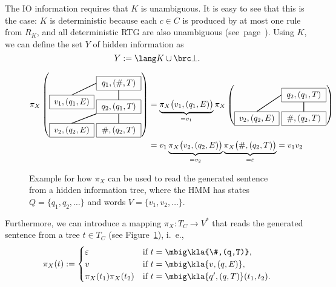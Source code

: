 The IO information requires that $K$ is unambiguous. It is easy to see that
this is the case: $K$ is deterministic because each $c\in C$ is produced by at
most one rule from $R_K$, and all deterministic RTG are also unambiguous
(see~page~\pageref{lemma:02-deterministic-is-unambiguous}).
Using $K$, we can define the set $Y$ of hidden information as
\[
 Y := \lang K \cup \brc\bot.
\]

\begin{figure}[t!]
 \begin{align*}
  \pi_X\left(\begin{tikzpicture}[every node/.style={rectangle,draw,minimum width=1.9cm},baseline=(current bounding box.center)]
   \node (t0) at (0,0) { $q_1,(\#,T)$ };
   \node (t1) at (0,-1) { $q_2,(q_1,T)$ } edge[thick] (t0);
   \node (t2) at (0,-2) { $\#,(q_2,T)$ } edge[thick] (t1);
   \node (e1) at (-2,-0.8) { $v_1,(q_1,E)$ }; \draw [thick] (t0.west) -- (e1.north);
   \node (e2) at (-2,-2) { $v_2,(q_2,E)$ }; \draw [thick] (t1.south west) -- (e2.north);
  \end{tikzpicture}\right)
  &=
   \underbrace{\pi_X\bigl(v_1,(q_1,E)\bigr)}_{=v_1}
   \pi_X\left(\begin{tikzpicture}[every node/.style={rectangle,draw,minimum width=1.9cm},baseline=(current bounding box.center)]
    \node (t1) at (0,0) { $q_2,(q_1,T)$ };
    \node (t2) at (0,-1) { $\#,(q_2,T)$ } edge[thick] (t1);
    \node (e2) at (-2,-1) { $v_2,(q_2,E)$ }; \draw [thick] (t1.west) -- (e2.north);
   \end{tikzpicture}\right)
  \\
  &= v_1
   \underbrace{\pi_X\bigl(v_2,(q_2,E)\bigr)}_{=v_2}
   \underbrace{\pi_X\bigl(\#,(q_2,T)\bigr)}_{=\eps}
   = v_1v_2
 \end{align*}
 \caption{\label{fig:03-readoff}%
  Example for how $\pi_X$ can be used to read the generated sentence from a hidden information tree, where the HMM has states $Q = \{q_1,q_2,\ldots\}$ and words $V = \{v_1,v_2,\ldots\}$.
 }
\end{figure}

\label{def:03-def-pi-x}
Furthermore, we can introduce a mapping $\pi_X: T_C \to V^*$ that reads the
generated sentence from a tree $t\in T_C$ (see Figure~\ref{fig:03-readoff}),
i.~e.,
\[
 \pi_X(t) := \begin{cases}
  \eps & \text{if } t = \mbig\kla{\#,(q,T)}, \\
  v    & \text{if } t = \mbig\kla{v,(q,E)}, \\
  \pi_X(t_1)\pi_X(t_2) & \text{if } t = \mbig\kla{q',(q,T)}(t_1,t_2).
 \end{cases}
\]

